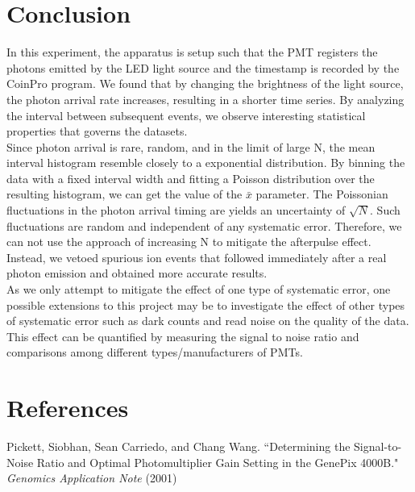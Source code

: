\documentclass[authoryear, 12pt,5p, times]{elsarticle}
\begin{document}
\section{Conclusion\label{end}}
In this experiment, the apparatus is setup such that the PMT registers the photons emitted by the LED light source and the timestamp is recorded by the CoinPro program.  We found that by changing the brightness of the light source, the photon arrival rate increases, resulting in a shorter time series. By analyzing the interval between subsequent events, we observe interesting statistical properties that governs the datasets. \\ \indent Since photon arrival is rare, random, and in the limit of large N, the mean interval histogram resemble closely to a exponential distribution. By binning the data with a fixed interval width and fitting a Poisson distribution over the resulting histogram, we can get the value of the $\bar{x}$ parameter.  The Poissonian fluctuations in the photon arrival timing are yields an uncertainty of $\sqrt{N}$. Such fluctuations are random and independent of any systematic error. Therefore, we can not use the approach of increasing N to mitigate the afterpulse effect. Instead, we vetoed  spurious ion events that followed immediately after a real photon emission and obtained more accurate results.
\\ \indent As we only attempt to mitigate the effect of one type of systematic error, one possible extensions to this project may be to investigate the effect of other types of systematic error such as dark counts and read noise on the quality of the data. This effect can be quantified by measuring the signal to noise ratio and comparisons among different types/manufacturers of PMTs.
\section{References}
\footnotesize
Pickett, Siobhan, Sean Carriedo, and Chang Wang. ``Determining the Signal-to-Noise Ratio and Optimal Photomultiplier Gain Setting in the GenePix 4000B." \textit{Genomics Application Note} (2001)
\end{document}
